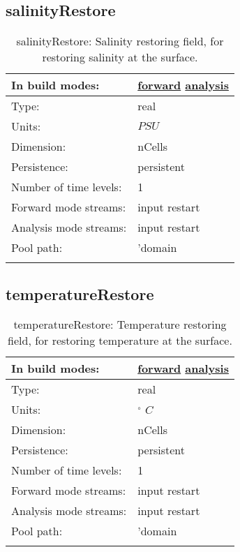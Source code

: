 \subsection[salinityRestore]{salinityRestore}
\label{subsec:var_sec_mesh_salinityRestore}
\begin{center}
\begin{longtable}{| p{2.0in} | p{4.0in} |}
        \hline 
        In build modes: & \hyperref[subsec:forward_var_tab_mesh]{forward} \hyperref[subsec:analysis_var_tab_mesh]{analysis} \\
        \hline 
        Type: & real \\
        \hline 
        Units: & $PSU$ \\
        \hline 
        Dimension: & nCells \\
        \hline 
        Persistence: & persistent \\
        \hline 
        Number of time levels: & 1 \\
        \hline 
		 Forward mode streams: &  input restart \\
        \hline 
		 Analysis mode streams: &  input restart \\
        \hline 
            Pool path: & 'domain %
 \\
		 \hline 
    \caption{salinityRestore: Salinity restoring field, for restoring salinity at the surface.}
\end{longtable}
\end{center}
\subsection[temperatureRestore]{temperatureRestore}
\label{subsec:var_sec_mesh_temperatureRestore}
\begin{center}
\begin{longtable}{| p{2.0in} | p{4.0in} |}
        \hline 
        In build modes: & \hyperref[subsec:forward_var_tab_mesh]{forward} \hyperref[subsec:analysis_var_tab_mesh]{analysis} \\
        \hline 
        Type: & real \\
        \hline 
        Units: & $^\circ$ $C$ \\
        \hline 
        Dimension: & nCells \\
        \hline 
        Persistence: & persistent \\
        \hline 
        Number of time levels: & 1 \\
        \hline 
		 Forward mode streams: &  input restart \\
        \hline 
		 Analysis mode streams: &  input restart \\
        \hline 
            Pool path: & 'domain %
 \\
		 \hline 
    \caption{temperatureRestore: Temperature restoring field, for restoring temperature at the surface.}
\end{longtable}
\end{center}
